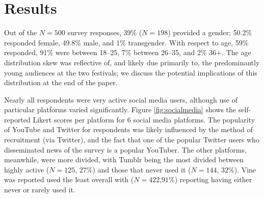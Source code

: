 \documentclass{sig-alternate}
\begin{document}
\section{Results}

Out of the $N=500$ survey responses, 39\% ($N=198$) provided a gender; 50.2\% responded female, 49.8\% male, and 1\% transgender.  With respect to age, 59\% responded, 91\% were between 18--25, 7\% between 26--35, and 2\% 36+.  The age distribution skew was reflective of, and likely due primarily to, the predominantly young audiences at the two festivals; we discuss the potential implications of this distribution at the end of the paper.

Nearly all respondents were very active social media users, although use of particular platforms varied significantly.  Figure \ref{fig:socialmedia} shows the self-reported Likert scores per platform for 6 social media platforms. The popularity of YouTube and Twitter for respondents was likely influenced by the method of recruitment (via Twitter), and the fact that one of the popular Twitter users who disseminated news of the survey is a popular YouTuber.  The other platforms, meanwhile, were more divided, with Tumblr being the most divided between highly active ($N=125$, $27\%$) and those that never used it ($N=144$, $32\%$).  Vine was reported used the least overall with ($N=422$,$91\%$) reporting having either never or rarely used it.
\end{document}
